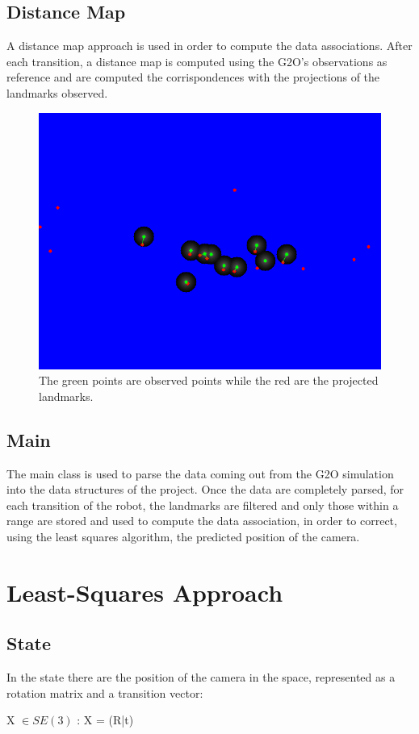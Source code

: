 \documentclass[10pt]{article}
\begin{document}
		\subsection{Distance Map}
		A distance map approach is used in order to compute the data associations.
		After each transition, a distance map is computed using the G2O's observations as reference and are computed the corrispondences with the projections of the landmarks observed.

		\begin{figure}[H]
			\centering
			\includegraphics[width=0.7\linewidth]{img/corrispondences}
			\caption{The green points are observed points while the red are the projected landmarks.}
			\label{fig:corrispondences}
		\end{figure}

		\subsection{Main}
		The main class is used to parse the data coming out from the G2O simulation into the data structures of the project.
		Once the data are completely parsed, for each transition of the robot, the landmarks are filtered and only those within a range are stored and used to compute the data association, in order to correct, using the least squares algorithm, the predicted position of the camera.\\
		 		
	\section{Least-Squares Approach}
	\subsection{State}
	In the state there are the position of the camera in the space, represented as a rotation matrix and a transition vector:\\
	\begin{center}
		X $\in \textit{SE}(3)$ : X = (R|t)
	\end{center}
	
\end{document}
